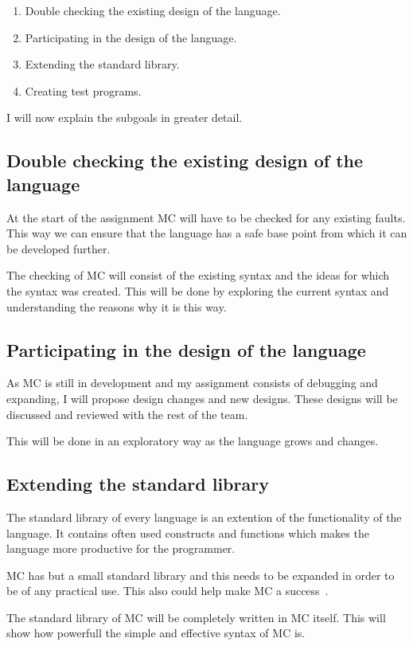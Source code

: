 \begin{enumerate}[noitemsep]
   \item Double checking the existing design of the language.
   \item Participating in the design of the language.
   \item Extending the standard library.
   \item Creating test programs.
\end{enumerate}

I will now explain the subgoals in greater detail.

\subsection{Double checking the existing design of the language}
At the start of the assignment MC will have to be checked for any existing faults.
This way we can ensure that the language has a safe base point from which it can be developed further.

The checking of MC will consist of the existing syntax and the ideas for which the syntax was created.
This will be done by exploring the current syntax and understanding the reasons why it is this way.

\subsection{Participating in the design of the language}
As MC is still in development and my assignment consists of debugging and expanding, I will propose design changes and new designs.
These designs will be discussed and reviewed with the rest of the team.

This will be done in an exploratory way as the language grows and changes.

\subsection{Extending the standard library}
The standard library of every language is an extention of the functionality of the language.
It contains often used constructs and functions which makes the language more productive for the programmer.

MC has but a small standard library and this needs to be expanded in order to be of any practical use.
This also could help make MC a success~\cite{khedker1997makes}.

The standard library of MC will be completely written in MC itself.
This will show how powerfull the simple and effective syntax of MC is.

